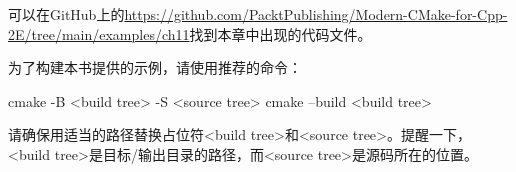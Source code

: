 可以在GitHub上的\url{https://github.com/PacktPublishing/Modern-CMake-for-Cpp-2E/tree/main/examples/ch11}找到本章中出现的代码文件。

为了构建本书提供的示例，请使用推荐的命令：

\begin{shell}
cmake -B <build tree> -S <source tree>
cmake --build <build tree>
\end{shell}

请确保用适当的路径替换占位符<build tree>和<source tree>。提醒一下，<build tree>是目标/输出目录的路径，而<source tree>是源码所在的位置。













